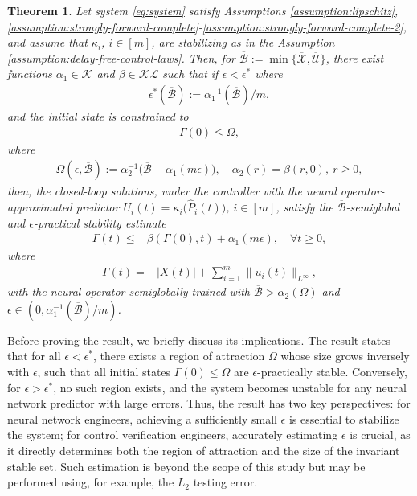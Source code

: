 \documentclass[letterpaper, 10 pt, conference]{ieeeconf}  %
\newtheorem{theorem}{Theorem}
\begin{document}
\begin{theorem}\label{thm:main_result}
Let system \eqref{eq:system} satisfy Assumptions \ref{assumption:lipschitz},\ref{assumption:strongly-forward-complete}-\ref{assumption:strongly-forward-complete-2}, and assume that $\kappa_i$, $i \in [m]$, are stabilizing as in the Assumption \ref{assumption:delay-free-control-laws}. Then, for $\overline{\mathcal{B}} := \min \{ \overline{\mathcal{X}}, \overline{\mathcal{U}} \}$, there exist functions $\alpha_1 \in \mathcal{K}$ and $\beta \in \mathcal{KL}$ such that if $\epsilon < \epsilon^*$ where
\begin{align}
    \epsilon^{*}(\overline{\mathcal{B}}) := \alpha_1^{-1}(\overline{\mathcal{B}})/m, \label{eq:epsilon_star}
\end{align}
and the initial state is constrained to
\begin{align}
    \Gamma(0) \leq \Omega, \label{eq:init_state_restriction}
\end{align}
where
\begin{align}
    \Omega(\epsilon, \overline{\mathcal{B}}) := \alpha_{2}^{-1} \bigg( \overline{\mathcal{B}} - \alpha_{1}(m\epsilon)\bigg), \quad \alpha_{2}(r) = \beta(r, 0), \ r \geq 0, \label{eq:Omega}
\end{align}
then, the closed-loop solutions, under the controller with the neural operator-approximated predictor $U_i(t) = \kappa_i \bigg( \hat{P}_i(t) \bigg)$, $i \in [m]$, satisfy the $\overline{\mathcal{B}}$-semiglobal and $\epsilon$-practical stability estimate
\begin{align}
    \Gamma(t) \leq& \beta(\Gamma(0), t) + \alpha_1(m\epsilon), \quad \forall t \geq 0, \label{eq:main_inequality}
\end{align}
where
\begin{align}
    \Gamma(t) =& |X(t)| + \sum_{i=1}^m \|u_i(t)\|_{L^\infty}, \label{eq:Xi}
\end{align}
with the neural operator semiglobally trained with $\overline{\mathcal{B}} > \alpha_2(\Omega)$ and $\epsilon \in (0, \alpha_1^{-1}(\overline{\mathcal{B}})/m)$.
\end{theorem}

Before proving the result, we briefly discuss its implications. The result states that for all $\epsilon < \epsilon^*$, there exists a region of attraction $\Omega$ whose size grows inversely with $\epsilon$, such that all initial states $\Gamma(0) \leq \Omega$ are $\epsilon$-practically stable. Conversely, for $\epsilon > \epsilon^*$, no such region exists, and the system becomes unstable for any neural network predictor with large errors. Thus, the result has two key perspectives: for neural network engineers, achieving a sufficiently small $\epsilon$ is essential to stabilize the system; for control verification engineers, accurately estimating $\epsilon$ is crucial, as it directly determines both the region of attraction and the size of the invariant stable set. Such estimation is beyond the scope of this study but may be performed using, for example, the $L_2$ testing error.
\end{document}
